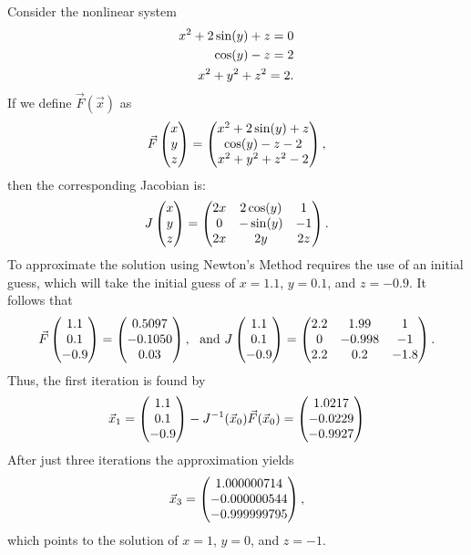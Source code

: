 \documentclass[twoside]{article}
\def\ds{\displaystyle}
\begin{document}
Consider the nonlinear system
\begin{eqnarray}
x^2+2\sin(y)+z = 0 \cr
\cos(y) - z = 2 \cr
x^2 + y^2 + z^2 = 2 \label{e:example2}.
\end{eqnarray}
If we define $\ds \vec F(\vec x)$ as
$$\vec F \begin{pmatrix} x \cr y \cr z \end{pmatrix} = \begin{pmatrix}  x^2+2\sin(y)+z \cr \cos(y) - z - 2 \cr x^2 + y^2 + z^2 - 2 \end{pmatrix},$$
then the corresponding Jacobian is:
$$J\begin{pmatrix} x \cr y \cr z \end{pmatrix}= \begin{pmatrix} 2x & 2 \cos(y) & 1 \cr 0 & -\sin(y) & -1 \cr 2x & 2y & 2z \end{pmatrix}.$$
To approximate the solution using Newton's Method requires the use of an initial guess, which will take the initial guess of $\ds x=1.1$, $y=0.1$, and $z=-0.9$. It follows that
$$ \vec F \begin{pmatrix} 1.1 \cr 0.1 \cr -0.9 \end{pmatrix} = \begin{pmatrix}  0.5097 \cr -0.1050 \cr 0.03  \end{pmatrix}, \ \ {\rm and} \ J\begin{pmatrix} 1.1 \cr 0.1 \cr -0.9 \end{pmatrix}= \begin{pmatrix} 2.2 & 1.99 & 1 \cr 0 & -0.998 & -1 \cr 2.2 & 0.2 & -1.8 \end{pmatrix}.$$
Thus, the first iteration is found by
$$\vec x_1 = \begin{pmatrix} 1.1 \cr 0.1 \cr -0.9 \end{pmatrix} - J^{-1}(\vec x_0)\vec F(\vec x_0) = \begin{pmatrix} 1.0217 \cr -0.0229 \cr -0.9927 \end{pmatrix}$$
After just three iterations the approximation yields
$$\vec x_3 = \begin{pmatrix} 1.000000714 \cr -0.000000544 \cr -0.999999795 \end{pmatrix},$$
which points to the solution of $x = 1$, $y=0$, and $z=-1$. 
\end{document}
